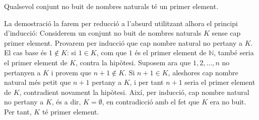 \begin{teorema}
Qualsevol conjunt no buit de nombres naturals té un primer element.
\end{teorema}

\begin{prova}
La demostració la farem per reducció a l'absurd utilitzant alhora el
principi d'inducció: Considerem un conjunt no buit de nombres naturals $K$
sense cap primer element. Provarem per inducció que cap nombre natural no
pertany a $K$. El cas base és $1\notin K$: si $1\in K$, com que $1$ és
el primer element de $\mathbb{N}$, també seria el primer element de $K$,
contra la hipòtesi. Suposem ara que $1,2,\ldots,n$ no pertanyen a $K$ i
provem que $n+1\notin K$. Si $n+1\in K$, aleshores cap nombre natural més
petit que $n+1$ pertany a $K$, i per tant $n+1$ seria el primer element de
$K$, contradient novament la hipòtesi. Així, per inducció, cap
nombre natural no pertany a $K$, és a dir, $K=\emptyset$, en contradicció
amb el fet que $K$ era no buit. Per tant, $K$ té primer element.
\end{prova}